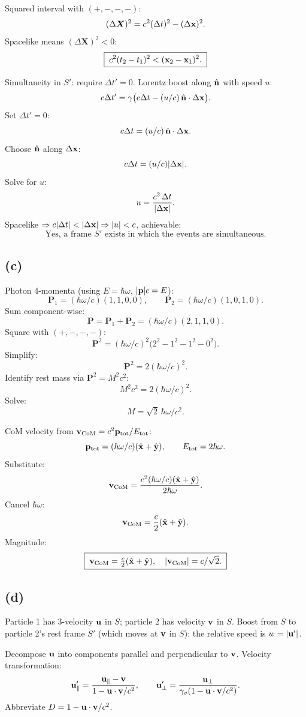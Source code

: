 \documentclass[11pt]{article}
\begin{document}
Squared interval with $(+,-,-,-)$:
\[ (\Delta\bm X)^2 = c^2(\Delta t)^2 - (\Delta\vb x)^2. \]
Spacelike means $(\Delta\bm X)^2 < 0$:
\[ \boxed{\;c^2(t_2-t_1)^2 < (\vb x_2-\vb x_1)^2.\;} \]

Simultaneity in $S'$: require $\Delta t' = 0$. Lorentz boost along $\hat{\vb n}$ with speed $u$:
\[ c\Delta t' = \gamma\bigl(c\Delta t - (u/c)\,\hat{\vb n}\cdot\Delta\vb x\bigr). \]
Set $\Delta t' = 0$:
\[ c\Delta t = (u/c)\,\hat{\vb n}\cdot\Delta\vb x. \]
Choose $\hat{\vb n}$ along $\Delta\vb x$:
\[ c\Delta t = (u/c)|\Delta\vb x|. \]
Solve for $u$:
\[ u = \frac{c^2\,\Delta t}{|\Delta\vb x|}. \]
Spacelike $\Rightarrow c|\Delta t| < |\Delta\vb x| \Rightarrow |u| < c$, achievable:
\[ \boxed{\;\text{Yes, a frame }S'\text{ exists in which the events are simultaneous}.\;} \]

\subsection*{(c)}

Photon 4-momenta (using $E=\hbar\omega$, $|\vb p|c = E$):
\[ \bm P_1 = (\hbar\omega/c)(1,1,0,0),\qquad \bm P_2 = (\hbar\omega/c)(1,0,1,0). \]
Sum component-wise:
\[ \bm P = \bm P_1+\bm P_2 = (\hbar\omega/c)(2,1,1,0). \]
Square with $(+,-,-,-)$:
\[ \bm P^2 = (\hbar\omega/c)^2\bigl(2^2-1^2-1^2-0^2\bigr). \]
Simplify:
\[ \bm P^2 = 2(\hbar\omega/c)^2. \]
Identify rest mass via $\bm P^2 = M^2 c^2$:
\[ M^2 c^2 = 2(\hbar\omega/c)^2. \]
Solve:
\[ \boxed{\;M = \sqrt{2}\,\hbar\omega/c^2.\;} \]

CoM velocity from $\vb v_\text{CoM} = c^2\vb p_\text{tot}/E_\text{tot}$:
\[ \vb p_\text{tot} = (\hbar\omega/c)(\hat{\vb x}+\hat{\vb y}),\qquad E_\text{tot} = 2\hbar\omega. \]
Substitute:
\[ \vb v_\text{CoM} = \frac{c^2 (\hbar\omega/c)(\hat{\vb x}+\hat{\vb y})}{2\hbar\omega}. \]
Cancel $\hbar\omega$:
\[ \vb v_\text{CoM} = \frac{c}{2}(\hat{\vb x}+\hat{\vb y}). \]
Magnitude:
\[ \boxed{\;\vb v_\text{CoM} = \tfrac{c}{2}(\hat{\vb x}+\hat{\vb y}),\quad |\vb v_\text{CoM}|=c/\sqrt{2}.\;} \]

\subsection*{(d)}

Particle 1 has 3-velocity $\vb u$ in $S$; particle 2 has velocity $\vb v$ in $S$. Boost from $S$ to particle 2's rest frame $S'$ (which moves at $\vb v$ in $S$); the relative speed is $w=|\vb u'|$.

Decompose $\vb u$ into components parallel and perpendicular to $\vb v$. Velocity transformation:
\[ \vb u'_\parallel = \frac{\vb u_\parallel - \vb v}{1-\vb u\cdot\vb v/c^2},\qquad \vb u'_\perp = \frac{\vb u_\perp}{\gamma_v(1-\vb u\cdot\vb v/c^2)}. \]
Abbreviate $D = 1-\vb u\cdot\vb v/c^2$.
\end{document}
